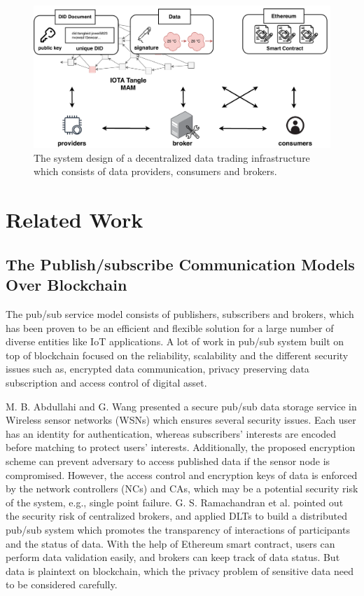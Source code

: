 \documentclass[conference]{IEEEtran}
\begin{document}
\begin{figure}[!t]
    \centering
    \includegraphics[width=3.in]{system_design}
    \caption{The system design of a decentralized data trading infrastructure which consists of data providers, consumers and brokers.}
    \label{fig:system_design}
\end{figure}

\section{Related Work}
\label{section:relatedWork}
\subsection{The Publish/subscribe Communication Models Over Blockchain}
The pub/sub service model consists of publishers, subscribers and brokers, which has been proven\cite{pubSubAnalysis, pubSubAnalysis2} to be an efficient and flexible solution for a large number of diverse entities like IoT applications. A lot of work in pub/sub system built on top of blockchain focused on the reliability, scalability and the different security issues such as, encrypted data communication, privacy preserving data subscription and access control of digital asset. 

M. B. Abdullahi and G. Wang\cite{centralPubSub} presented a secure pub/sub data storage service in Wireless sensor networks (WSNs) which ensures several security issues. Each user has an identity for authentication, whereas subscribers' interests are encoded before matching to protect users' interests. Additionally, the proposed encryption scheme can prevent adversary to access published data if the sensor node is compromised. However, the access control and encryption keys of data is enforced by the network controllers (NCs) and CAs, which may be a potential security risk of the system, e.g., single point failure. G. S. Ramachandran et al.\cite{trinity} pointed out the security risk of centralized brokers, and applied DLTs to build a distributed pub/sub system which promotes the transparency of interactions of participants and the status of data. With the help of Ethereum smart contract, users can perform data validation easily, and brokers can keep track of data status. But data is plaintext on blockchain, which the privacy problem of sensitive data need to be considered carefully.
\end{document}
